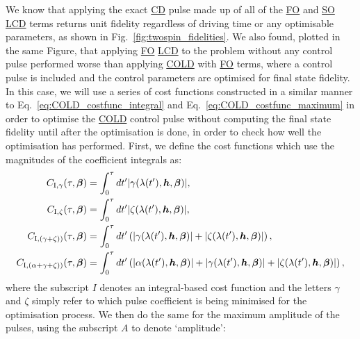 \documentclass[a4paper,oneside,11pt]{book}
\newcommand{\betabb}{\boldsymbol{\beta}}
\newcommand{\hbb}{\boldsymbol{h}}
\newcommand{\acrref}[1]{\hyperref[acr:#1]{#1}}
\begin{document}
We know that applying the exact \acrref{CD} pulse made up of all of the \acrref{FO} and \acrref{SO} \acrref{LCD} terms returns unit fidelity regardless of driving time or any optimisable parameters, as shown in Fig.~\ref{fig:twospin_fidelities}. We also found, plotted in the same Figure, that applying \acrref{FO} \acrref{LCD} to the problem without any control pulse performed worse than applying \acrref{COLD} with \acrref{FO} terms, where a control pulse is included and the control parameters are optimised for final state fidelity. In this case, we will use a series of cost functions constructed in a similar manner to Eq.~\eqref{eq:COLD_costfunc_integral} and Eq.~\eqref{eq:COLD_costfunc_maximum} in order to optimise the \acrref{COLD} control pulse without computing the final state fidelity until after the optimisation is done, in order to check how well the optimisation has performed. First, we define the cost functions which use the magnitudes of the coefficient integrals as:
 \begin{equation}\label{eq:twospin_costfunc_int}
    \begin{aligned}
        C_{\rm I, \gamma}(\tau, \betabb) &= \int_{0}^{\tau} dt^{\prime} |\gamma(\lambda(t^{\prime}), \hbb, \betabb)|,\\
        C_{\rm I, \zeta}(\tau, \betabb) &= \int_{0}^{\tau} dt^{\prime} |\zeta(\lambda(t^{\prime}), \hbb, \betabb)|,\\
        C_{\rm I, (\gamma + \zeta))}(\tau, \betabb) &= \int_{0}^{\tau} dt^{\prime} \left(|\gamma(\lambda(t^{\prime}), \hbb, \betabb)| + |\zeta(\lambda(t^{\prime}), \hbb, \betabb)|\right), \\
        C_{\rm I, (\alpha + \gamma + \zeta))}(\tau, \betabb) &= \int_{0}^{\tau} dt^{\prime} \left(|\alpha(\lambda(t^{\prime}), \hbb, \betabb)| + |\gamma(\lambda(t^{\prime}), \hbb, \betabb)| + |\zeta(\lambda(t^{\prime}), \hbb, \betabb)|\right),
    \end{aligned}
\end{equation}
where the subscript $I$ denotes an integral-based cost function and the letters $\gamma$ and $\zeta$ simply refer to which pulse coefficient is being minimised for the optimisation process. We then do the same for the maximum amplitude of the pulses, using the subscript $A$ to denote `amplitude':
\end{document}
